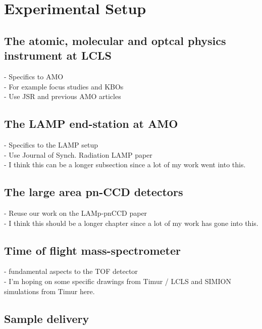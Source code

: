 \chapter{Experimental Setup}\label{ch:exp_setup}
\section{The atomic, molecular and optcal physics instrument at LCLS}
- Specifics to AMO\\
- For example focus studies and KBOs\\
- Use JSR and previous AMO articles
\section{The LAMP end-station at AMO}
- Specifics to the LAMP setup\\
- Use Journal of Synch. Radiation LAMP paper\\
- I think this can be a longer subsection since a lot of my work went into this.
\section{The large area pn-CCD detectors}\label{sec:pnCCD}
- Reuse our work on the LAMp-pnCCD paper\\
- I think this should be a longer chapter since a lot of my work has gone into this.
\section{Time of flight mass-spectrometer}
- fundamental aspects to the TOF detector\\
- I'm hoping on some specific drawings from Timur / LCLS and SIMION simulations from Timur here.
\section{Sample delivery}
